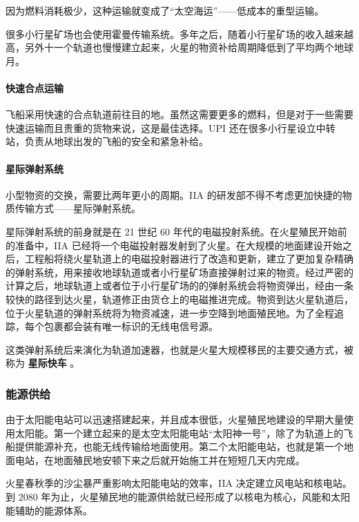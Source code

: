 \documentclass[letterpaper,10pt]{sphinxmanual}
\begin{document}
因为燃料消耗极少，这种运输就变成了“太空海运”——低成本的重型运输。

很多小行星矿场也会使用霍曼传输系统。多年之后，随着小行星矿场的收入越来越高，另外十一个轨道也慢慢建立起来，火星的物资补给周期降低到了平均两个地球月。


\paragraph{快速合点运输}
\label{history:id23}
飞船采用快速的合点轨道前往目的地。虽然这需要更多的燃料，但是对于一些需要快速运输而且贵重的货物来说，这是最佳选择。UPI 还在很多小行星设立中转站，负责从地球出发的飞船的安全和紧急补给。


\paragraph{星际弹射系统}
\label{history:index-39}\label{history:id24}
小型物资的交换，需要比两年更小的周期。IIA 的研发部不得不考虑更加快捷的物质传输方式——星际弹射系统。

星际弹射系统的前身就是在 21 世纪 60 年代的电磁投射系统。在火星殖民开始前的准备中，IIA 已经将一个电磁投射器发射到了火星。在大规模的地面建设开始之后，工程船将绕火星轨道上的电磁投射器进行了改造和更新，建立了更加复杂精确的弹射系统，用来接收地球轨道或者小行星矿场直接弹射过来的物资。经过严密的计算之后，地球轨道上或者位于小行星矿场的的弹射系统会将物资弹出，经由一条较快的路径到达火星，轨道修正由货仓上的电磁推进完成。物资到达火星轨道后，位于火星轨道的弹射系统将为物资减速，进一步空降到地面殖民地。为了全程追踪，每个包裹都会装有唯一标识的无线电信号源。

这类弹射系统后来演化为轨道加速器，也就是火星大规模移民的主要交通方式，被称为 \textbf{星际快车} 。


\subsubsection{能源供给}
\label{history:id25}
由于太阳能电站可以迅速搭建起来，并且成本很低，火星殖民地建设的早期大量使用太阳能。第一个建立起来的是太空太阳能电站“太阳神一号”，除了为轨道上的飞船提供能源补充，也能无线传输给地面使用。第二个太阳能电站，也就是第一个地面电站，在地面殖民地安顿下来之后就开始施工并在短短几天内完成。

火星春秋季的沙尘暴严重影响太阳能电站的效率，IIA 决定建立风电站和核电站。到 2080 年为止，火星殖民地的能源供给就已经形成了以核电为核心，风能和太阳能辅助的能源体系。
\end{document}
